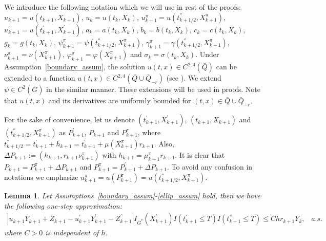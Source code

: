 \documentclass{article}
\newtheorem{lemma}[theorem]{Lemma}
\theoremstyle{definition}
\numberwithin{equation}{section}
\begin{document}
 We introduce the following notation which we will use in rest of the proofs: $u_{k+1} = u(t_{k+1},X_{k+1})$, $u_{k}= u(t_{k},X_{k})$, $u_{k+1}^{\pi}=u(t_{k+1/2}^{''},X_{k+1}^{\pi})$, $u^{\prime}_{k+1} = u(t_{k+1}^{'},X_{k+1}^{'})$, $a_{k} =a(t_{k}, X_{k})$, $b_{k}= b(t_{k},X_{k})$, $c_{k}= c(t_{k},X_{k})$, $g_{k}= g(t_{k},X_{k})$, $\psi_{k+1}^{\pi} = \psi(t_{k+1/2}^{''}, X_{k+1}^{\pi})$, $\gamma_{k+1}^{\pi}= \gamma(t_{k+1/2}^{''},X_{k+1}^{\pi})$, $\nu_{k+1}^{\pi} = \nu(X_{k+1}^{\pi})$, $ \varphi^{\pi}_{k+1} = \varphi(X_{k+1}^{\pi}) $ and $\sigma_{k} = \sigma(t_{k}, X_{k})$. 
  Under Assumption~\ref{boundary_assum}, the solution $u(t,x) \in C^{2,4}(\bar{Q})$ can be extended to  a function $u(t,x) \in C^{2,4}(\bar{Q}\cup\bar{Q}_{-r})$ (see \cite[Proposition 1.17]{19}). We extend $\psi \in C^{2}(\bar{G})$ in the similar manner. These extensions will be used in proofs. Note that $u(t,x)$ and its derivatives are uniformly bounded for $(t,x)\in \bar{Q} \cup \bar{Q}_{-r}$. 


For the sake of convenience, let us denote $(t_{k+1}^{'}, X_{k+1}^{'})$, $(t_{k+1}, X_{k+1})$ and $(t_{k+1/2}^{''}, X_{k+1}^{\pi})$ as $P_{k+1}^{'}$, $P_{k+1}$ and $P_{k+1}^{\pi}$, where $t_{k+ 1/2}^{''} =t_{k+1}^{'} + h_{k+1} =  t_{k+1}^{'} + \mu(X^{\pi}_{k+1})r_{k+1}$. Also, $\Delta P_{k+1} := (h_{k+1}, r_{k+1}\nu_{k+1}^{\pi})$ with $h_{k+1} = \mu^{\pi}_{k+1}r_{k+1}$. It is clear that $P_{k+1} = P_{k+1}^{\pi} + \Delta P_{k+1}$ and $ P_{k+1}^{\pi} = P_{k+1}^{'} + \Delta P_{k+1}$. To avoid any confusion in notations we emphasize $u_{k+1}^{\pi} = u(P_{k+1}^{\pi})  = u(t_{k+1/2}^{''}, X_{k+1}^{\pi})$.
\begin{lemma}\label{sticky_lemma_4.3}
Let Assumptions~\ref{boundary_assum}-\ref{ellip_assum} hold, then we have the following one-step approximation:
\begin{align*}
|u_{k+1}Y_{k+1} + Z_{k+1} - u_{k+1}^{'}Y_{k+1}^{'} - Z_{k+1}^{'}   |I_{\bar{G}^{c}}(X_{k+1}^{'})I(t^{'}_{k+1} \leq T)I(t^{''}_{k+1} \leq T) \leq Chr_{k+1}Y_{k},\;\; \;a.s.
\end{align*}
where $C > 0$ is independent of $h$.
\end{lemma}
\end{document}
